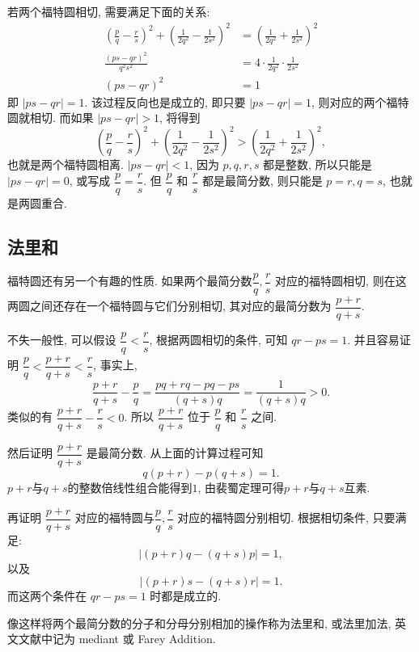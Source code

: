 若两个福特圆相切, 需要满足下面的关系:
\begin{align*}
\left(\frac{p}{q} - \frac{r}{s}\right)^2 + \left( \frac{1}{2q^2} - \frac{1}{2s^2} \right)^2 &= \left( \frac{1}{2q^2} + \frac{1}{2s^2} \right)^2 \\
\frac{(ps-qr)^2}{q^2s^2} &= 4\cdot \frac{1}{2q^2}\cdot\frac{1}{2s^2}\\
(ps-qr)^2 &= 1
\end{align*}
即 $|ps-qr| = 1$. 
该过程反向也是成立的,  即只要 $|ps-qr| = 1$, 则对应的两个福特圆就相切. 
而如果 $|ps-qr| > 1$, 将得到
$$ \left(\frac{p}{q} - \frac{r}{s}\right)^2 + \left( \frac{1}{2q^2} - \frac{1}{2s^2} \right)^2 > \left( \frac{1}{2q^2} + \frac{1}{2s^2} \right)^2 ,$$
也就是两个福特圆相离. $|ps-qr| < 1$, 因为 $p,q,r,s$ 都是整数, 所以只能是 $|ps-qr| = 0$, 或写成 $\dfrac{p}{q} = \dfrac{r}{s}$. 但 $\dfrac{p}{q}$ 和 $\dfrac{r}{s}$ 都是最简分数, 则只能是 $p=r, q=s$, 也就是两圆重合.


\subsection{法里和}
福特圆还有另一个有趣的性质. 如果两个最简分数$\dfrac{p}{q},\dfrac{r}{s}$ 对应的福特圆相切, 则在这两圆之间还存在一个福特圆与它们分别相切, 其对应的最简分数为 $\dfrac{p+r}{q+s}$. 

不失一般性, 可以假设 $\dfrac{p}{q} < \dfrac{r}{s}$, 根据两圆相切的条件, 可知 $qr - ps = 1$. 并且容易证明 $\dfrac{p}{q} < \dfrac{p+r}{q+s} < \dfrac{r}{s}$, 事实上, 
\[\frac{p+r}{q+s} - \frac{p}{q} = \frac{pq+rq-pq-ps}{(q+s)q} = \frac{1}{(q+s)q} > 0 .\]
类似的有 $\dfrac{p+r}{q+s} - \dfrac{r}{s} < 0$. 所以 $\dfrac{p+r}{q+s}$ 位于 $\dfrac{p}{q}$ 和 $\dfrac{r}{s}$ 之间.

然后证明 $\dfrac{p+r}{q+s}$ 是最简分数. 从上面的计算过程可知
\[ q(p+r) - p(q+s) = 1 .\]
$p+r$与$q+s$的整数倍线性组合能得到$1$, 由裴蜀定理可得$p+r$与$q+s$互素.

再证明 $\dfrac{p+r}{q+s}$ 对应的福特圆与$\dfrac{p}{q},\dfrac{r}{s}$ 对应的福特圆分别相切. 根据相切条件, 只要满足:
\[ |(p+r)q - (q+s)p| = 1 ,\]
以及
\[ |(p+r)s - (q+s)r| = 1  .\]
而这两个条件在 $qr - ps = 1$ 时都是成立的.

像这样将两个最简分数的分子和分母分别相加的操作称为法里和, 或法里加法, 英文文献中记为 mediant 或 Farey Addition.















